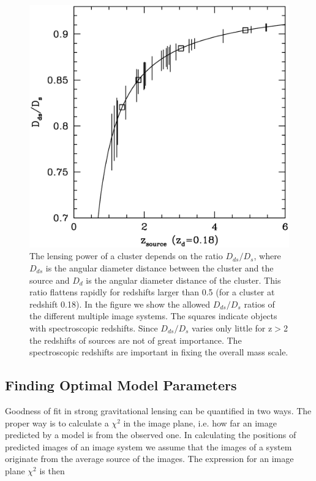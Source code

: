 \documentclass[useAMS,usenatbib]{mn2e}
\newcounter{one}   \setcounter{one}{1}
\newcounter{two}   \setcounter{two}{2}
\begin{document}
\begin{figure}
  \centering
  \includegraphics[height=\columnwidth]{figs/DdsDs.ps}
  \caption{ The lensing power of a cluster depends on the ratio
    ${D_{ds} / D_{s}}$, where $D_{ds}$ is the angular diameter
    distance between the cluster and the source and $D_{d}$ is the
    angular diameter distance of the cluster. This ratio flattens
    rapidly for redshifts larger than 0.5 (for a cluster at redshift
    0.18).  In the figure we show the allowed ${D_{ds} / D_{s}}$
    ratios of the different multiple image systems. The squares
    indicate objects with spectroscopic redshifts. Since ${D_{ds} /
    D_{s}}$ varies only little for z$>$2 the redshifts of sources are
    not of great importance. The spectroscopic redshifts are important
    in fixing the overall mass scale.}
  \label{fig:ddsds}
\end{figure}



\subsection{Finding Optimal Model Parameters}

Goodness of fit in strong gravitational lensing can be quantified in
two ways. The proper way is to calculate a $\chi^2$ in the image
plane, i.e. how far an image predicted by a model is from the observed
one. In calculating the positions of predicted images of an image
system we assume that the images of a system originate from the
average source of the images. The expression for an image plane
$\chi^2$ is then
\end{document}
